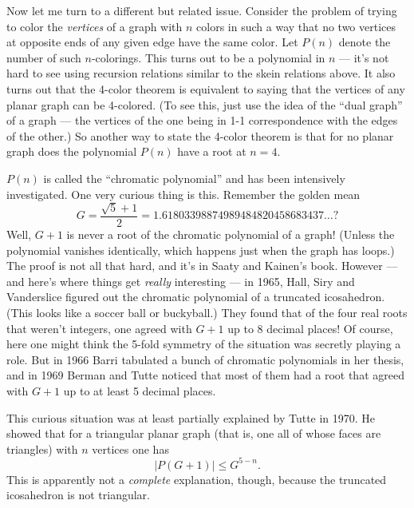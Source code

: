 \documentclass{article}
\begin{document}
Now let me turn to a different but related issue. Consider the problem
of trying to color the \emph{vertices} of a graph with \(n\) colors in
such a way that no two vertices at opposite ends of any given edge have
the same color. Let \(P(n)\) denote the number of such \(n\)-colorings.
This turns out to be a polynomial in \(n\) --- it's not hard to see
using recursion relations similar to the skein relations above. It also
turns out that the 4-color theorem is equivalent to saying that the
vertices of any planar graph can be 4-colored. (To see this, just use
the idea of the ``dual graph'' of a graph --- the vertices of the one
being in 1-1 correspondence with the edges of the other.) So another way
to state the 4-color theorem is that for no planar graph does the
polynomial \(P(n)\) have a root at \(n = 4\).

\(P(n)\) is called the ``chromatic polynomial'' and has been intensively
investigated. One very curious thing is this. Remember the golden mean
\[G = \frac{\sqrt{5} + 1}{2} = 1.61803398874989484820458683437\ldots?\]
Well, \(G + 1\) is never a root of the chromatic polynomial of a graph!
(Unless the polynomial vanishes identically, which happens just when the
graph has loops.) The proof is not all that hard, and it's in Saaty and
Kainen's book. However --- and here's where things get \emph{really}
interesting --- in 1965, Hall, Siry and Vanderslice figured out the
chromatic polynomial of a truncated icosahedron. (This looks like a
soccer ball or buckyball.) They found that of the four real roots that
weren't integers, one agreed with \(G + 1\) up to 8 decimal places! Of
course, here one might think the 5-fold symmetry of the situation was
secretly playing a role. But in 1966 Barri tabulated a bunch of
chromatic polynomials in her thesis, and in 1969 Berman and Tutte
noticed that most of them had a root that agreed with \(G + 1\) up to at
least 5 decimal places.

This curious situation was at least partially explained by Tutte in
1970. He showed that for a triangular planar graph (that is, one all of
whose faces are triangles) with \(n\) vertices one has
\[|P(G + 1)| \leqslant G^{5-n}.\] This is apparently not a
\emph{complete} explanation, though, because the truncated icosahedron
is not triangular.
\end{document}
